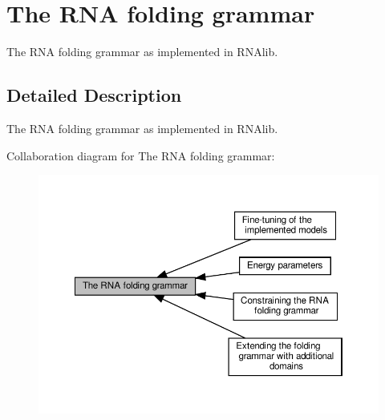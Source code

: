 \hypertarget{group__grammar}{}\section{The R\+NA folding grammar}
\label{group__grammar}


The R\+NA folding grammar as implemented in R\+N\+Alib.  




\subsection{Detailed Description}
The R\+NA folding grammar as implemented in R\+N\+Alib. 

Collaboration diagram for The R\+NA folding grammar\+:
\nopagebreak
\begin{figure}[H]
\begin{center}
\leavevmode
\includegraphics[width=350pt]{group__grammar}
\end{center}
\end{figure}
